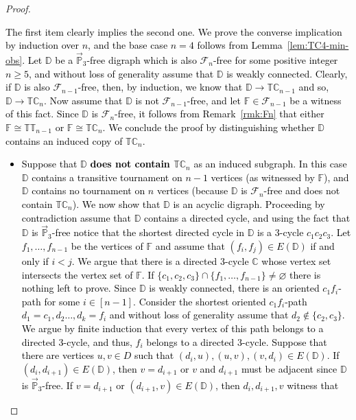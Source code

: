 \documentclass{article}
\theoremstyle{definition}
\theoremstyle{remark}
\newcommand{\blue}[1]{\textcolor{black}{#1}}
\newcommand{\bC}{{\mathbb C}}
\newcommand{\bD}{{\mathbb D}}
\newcommand{\bF}{{\mathbb F}}
\newcommand{\bP}{{\mathbb P}}
\newcommand{\bT}{{\mathbb T}}
\newcommand{\calF}{{\mathcal F}}
\begin{document}
\begin{proof}
    \blue{The first item clearly implies the second one. We prove the converse implication by induction
    over $n$, and the base case $n = 4$ follows from Lemma~\ref{lem:TC4-min-obs}.
    Let $\bD$ be a $\vec{\bP}_3$-free digraph which is also $\calF_n$-free
    for some positive integer $n \ge 5$, and without loss of generality assume that $\bD$ is weakly
    connected. Clearly, if $\bD$ is also 
    $\calF_{n-1}$-free, then, by induction, we know that $\bD\to \bT\bC_{n-1}$
    and so, $\bD\to  \bT\bC_n$. Now assume that $\bD$ is not $\calF_{n-1}$-free,
    and let $\bF\in \calF_{n-1}$ be a witness of this fact. Since $\bD$ is $\calF_n$-free,
    it follows from Remark~\ref{rmk:Fn} that either $\bF \cong \bT\bT_{n-1}$ or 
    $\bF\cong \bT\bC_n$. We conclude the proof by distinguishing whether $\bD$ contains
    an induced copy of $\bT\bC_n$.
    \begin{itemize}
        \item Suppose that $\bD$ \textbf{does not contain $\bT\bC_n$} as an induced subgraph. 
        In this case $\bD$ contains a transitive tournament on $n-1$ vertices (as witnessed
        by $\bF$), and $\bD$ contains no tournament on $n$ vertices (because $\bD$ is
        $\calF_n$-free and does not contain $\bT\bC_n$).
        We now show that $\bD$ is an acyclic digraph. Proceeding by contradiction
        assume that $\bD$ contains a directed cycle, and using the fact that $\bD$ is $\vec{\bP}_3$-free
        notice that the shortest directed cycle in $\bD$ is a $3$-cycle $c_1c_2c_3$. 
        Let $f_1,\dots, f_{n-1}$ be the vertices of $\bF$ and assume that $(f_i,f_j)\in E(\bD)$ if
        and only if $i < j$. We argue that there is a directed $3$-cycle $\bC$ whose vertex set
        intersects the vertex set of $\bF$. If $\{c_1,c_2,c_3\}\cap \{f_1, \dots, f_{n-1}\}\neq \varnothing$
        there is nothing left to prove. Since $\bD$ is weakly connected, there is an oriented
        $c_1f_i$-path for some $i\in[n-1]$. Consider the shortest oriented $c_1f_i$-path $d_1 = c_1,d_2\dots, d_k = f_i$
        and without loss of generality assume that $d_2 \not\in\{c_2,c_3\}$. We argue by finite
        induction that every vertex of this path belongs to a directed $3$-cycle, and thus, $f_i$ belongs to 
        a directed $3$-cycle. Suppose that there are vertices $u,v\in D$ such that $(d_i,u),(u,v),(v,d_i)\in E(\bD)$.
        If $(d_i,d_{i+1})\in E(\bD)$, then $v = d_{i+1}$ or $v$ and $d_{i+1}$ must be adjacent since $\bD$ is
        $\vec{\bP}_3$-free.  If $v = d_{i+1}$ or $(d_{i+1}, v)\in E(\bD)$, then $d_i,d_{i+1}, v$ witness that

\end{itemize}}
\end{proof}
\end{document}
